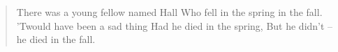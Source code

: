 \documentclass{article}
\begin{document}
\noindent 

\begin{verse}
\obeylines
There was a young fellow named Hall
Who fell in the spring in the fall.
'Twould have been a sad thing
Had he died in the spring,
But he didn’t – he died in the fall.
\end{verse}
\end{document}
